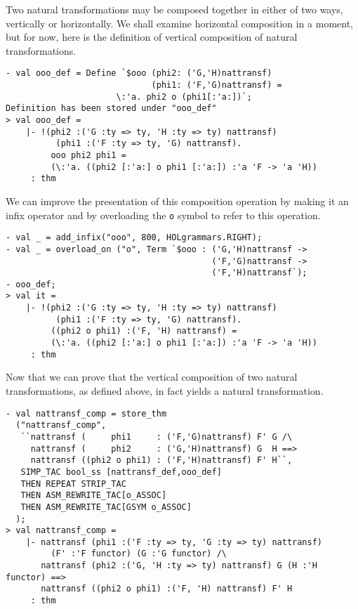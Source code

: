 
Two natural transformations may be composed together in either of two
ways, vertically or horizontally.  We shall examine
horizontal composition in a moment, but for now, here is the definition
of vertical composition of natural transformations.
\begin{session}
\begin{verbatim}
- val ooo_def = Define `$ooo (phi2: ('G,'H)nattransf)
                             (phi1: ('F,'G)nattransf) =
                      \:'a. phi2 o (phi1[:'a:])`;
Definition has been stored under "ooo_def"
> val ooo_def =
    |- !(phi2 :('G :ty => ty, 'H :ty => ty) nattransf)
          (phi1 :('F :ty => ty, 'G) nattransf).
         ooo phi2 phi1 =
         (\:'a. ((phi2 [:'a:] o phi1 [:'a:]) :'a 'F -> 'a 'H))
     : thm
\end{verbatim}
\end{session}

We can improve the presentation of this composition operation by making it an
infix operator and by overloading the \texttt{o} symbol to refer to this operation.
\begin{session}
\begin{verbatim}
- val _ = add_infix("ooo", 800, HOLgrammars.RIGHT);
- val _ = overload_on ("o", Term `$ooo : ('G,'H)nattransf ->
                                         ('F,'G)nattransf ->
                                         ('F,'H)nattransf`);
- ooo_def;
> val it =
    |- !(phi2 :('G :ty => ty, 'H :ty => ty) nattransf)
          (phi1 :('F :ty => ty, 'G) nattransf).
         ((phi2 o phi1) :('F, 'H) nattransf) =
         (\:'a. ((phi2 [:'a:] o phi1 [:'a:]) :'a 'F -> 'a 'H))
     : thm
\end{verbatim}
\end{session}

Now that we can prove that the vertical composition of two natural transformations,
as defined above, in fact yields a natural transformation.
\begin{session}
\begin{verbatim}
- val nattransf_comp = store_thm
  ("nattransf_comp",
   ``nattransf (     phi1     : ('F,'G)nattransf) F' G /\
     nattransf (     phi2     : ('G,'H)nattransf) G  H ==>
     nattransf ((phi2 o phi1) : ('F,'H)nattransf) F' H``,
   SIMP_TAC bool_ss [nattransf_def,ooo_def]
   THEN REPEAT STRIP_TAC
   THEN ASM_REWRITE_TAC[o_ASSOC]
   THEN ASM_REWRITE_TAC[GSYM o_ASSOC]
  );
> val nattransf_comp =
    |- nattransf (phi1 :('F :ty => ty, 'G :ty => ty) nattransf)
         (F' :'F functor) (G :'G functor) /\
       nattransf (phi2 :('G, 'H :ty => ty) nattransf) G (H :'H functor) ==>
       nattransf ((phi2 o phi1) :('F, 'H) nattransf) F' H
     : thm
\end{verbatim}
\end{session}

